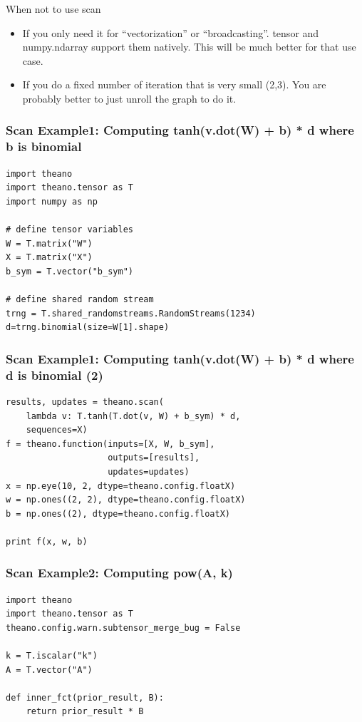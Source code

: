 \documentclass[utf8x,xcolor=pdftex,dvipsnames,table]{beamer}
\begin{document}
\begin{frame}{When not to use scan}
\begin{itemize}
\item If you only need it for ``vectorization'' or
  ``broadcasting''. tensor and numpy.ndarray support them
  natively. This will be much better for that use case.

\item If you do a fixed number of iteration that is very small (2,3). You
  are probably better to just unroll the graph to do it.

\end{itemize}
\end{frame}


\begin{frame}
  \frametitle{Scan Example1: Computing tanh(v.dot(W) + b) * d where b is binomial}

\begin{lstlisting}
import theano
import theano.tensor as T
import numpy as np

# define tensor variables
W = T.matrix("W")
X = T.matrix("X")
b_sym = T.vector("b_sym")

# define shared random stream
trng = T.shared_randomstreams.RandomStreams(1234)
d=trng.binomial(size=W[1].shape)
\end{lstlisting}
\end{frame}


\begin{frame}[fragile]
  \frametitle{Scan Example1: Computing tanh(v.dot(W) + b) * d where d is binomial (2)}

\begin{lstlisting}
results, updates = theano.scan(
    lambda v: T.tanh(T.dot(v, W) + b_sym) * d,
    sequences=X)
f = theano.function(inputs=[X, W, b_sym],
                    outputs=[results],
                    updates=updates)
x = np.eye(10, 2, dtype=theano.config.floatX)
w = np.ones((2, 2), dtype=theano.config.floatX)
b = np.ones((2), dtype=theano.config.floatX)

print f(x, w, b)
\end{lstlisting}
\end{frame}

\begin{frame}[fragile]
  \frametitle{Scan Example2: Computing pow(A, k)}

\begin{lstlisting}
import theano
import theano.tensor as T
theano.config.warn.subtensor_merge_bug = False

k = T.iscalar("k")
A = T.vector("A")

def inner_fct(prior_result, B):
    return prior_result * B
\end{lstlisting}
\end{frame}
\end{document}
